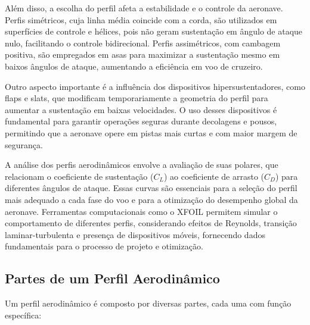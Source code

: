 Além disso, a escolha do perfil afeta a estabilidade e o controle da aeronave. Perfis simétricos, cuja linha média coincide com a corda, são utilizados em superfícies de controle e hélices, pois não geram sustentação em ângulo de ataque nulo, facilitando o controle bidirecional. Perfis assimétricos, com cambagem positiva, são empregados em asas para maximizar a sustentação mesmo em baixos ângulos de ataque, aumentando a eficiência em voo de cruzeiro.

Outro aspecto importante é a influência dos dispositivos hipersustentadores, como flaps e slats, que modificam temporariamente a geometria do perfil para aumentar a sustentação em baixas velocidades. O uso desses dispositivos é fundamental para garantir operações seguras durante decolagens e pousos, permitindo que a aeronave opere em pistas mais curtas e com maior margem de segurança.

A análise dos perfis aerodinâmicos envolve a avaliação de suas polares, que relacionam o coeficiente de sustentação (\(C_L\)) ao coeficiente de arrasto (\(C_D\)) para diferentes ângulos de ataque. Essas curvas são essenciais para a seleção do perfil mais adequado a cada fase do voo e para a otimização do desempenho global da aeronave. Ferramentas computacionais como o XFOIL permitem simular o comportamento de diferentes perfis, considerando efeitos de Reynolds, transição laminar-turbulenta e presença de dispositivos móveis, fornecendo dados fundamentais para o processo de projeto e otimização.

\subsection{Partes de um Perfil Aerodinâmico}
Um perfil aerodinâmico é composto por diversas partes, cada uma com função específica:

